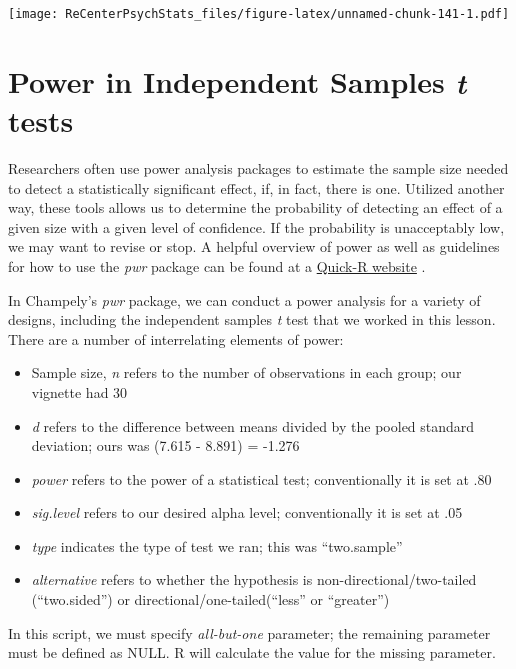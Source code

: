 \documentclass[
  11pt,
]{book}
\providecommand{\tightlist}{%
  \setlength{\itemsep}{0pt}\setlength{\parskip}{0pt}}
\begin{document}
\texttt{[image: ReCenterPsychStats\_files/figure-latex/unnamed-chunk-141-1.pdf]}

\hypertarget{power-in-independent-samples-t-tests-1}{%
\section{\texorpdfstring{Power in Independent Samples \emph{t} tests}{Power in Independent Samples t tests}}\label{power-in-independent-samples-t-tests-1}}

Researchers often use power analysis packages to estimate the sample size needed to detect a statistically significant effect, if, in fact, there is one. Utilized another way, these tools allows us to determine the probability of detecting an effect of a given size with a given level of confidence. If the probability is unacceptably low, we may want to revise or stop. A helpful overview of power as well as guidelines for how to use the \emph{pwr} package can be found at a \href{https://www.statmethods.net/stats/power.html}{Quick-R website} \citep{kabacoff_power_2017}.

In Champely's \emph{pwr} package, we can conduct a power analysis for a variety of designs, including the independent samples \emph{t} test that we worked in this lesson. There are a number of interrelating elements of power:

\begin{itemize}
\tightlist
\item
  Sample size, \emph{n} refers to the number of observations in each group; our vignette had 30
\item
  \emph{d} refers to the difference between means divided by the pooled standard deviation; ours was (7.615 - 8.891) = -1.276
\item
  \emph{power} refers to the power of a statistical test; conventionally it is set at .80
\item
  \emph{sig.level} refers to our desired alpha level; conventionally it is set at .05
\item
  \emph{type} indicates the type of test we ran; this was ``two.sample''
\item
  \emph{alternative} refers to whether the hypothesis is non-directional/two-tailed (``two.sided'') or directional/one-tailed(``less'' or ``greater'')
\end{itemize}

In this script, we must specify \emph{all-but-one} parameter; the remaining parameter must be defined as NULL. R will calculate the value for the missing parameter.
\end{document}
